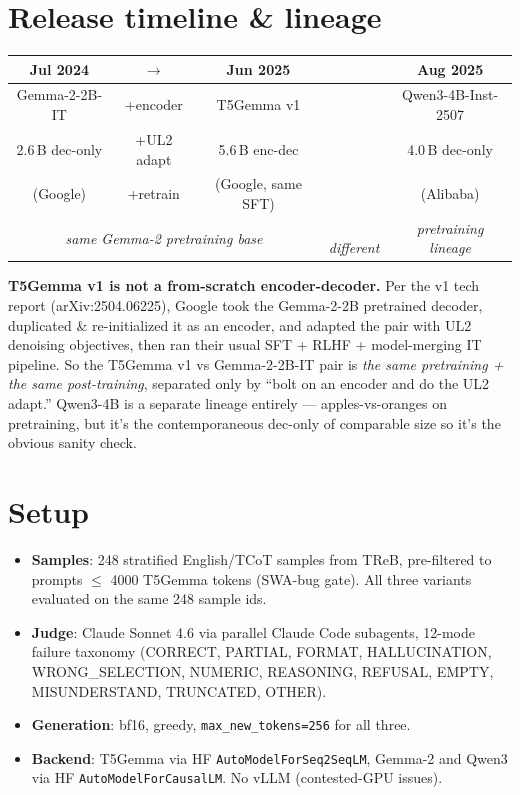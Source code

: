 \documentclass[11pt]{article}
\begin{document}
\section{Release timeline \& lineage}

\begin{center}\small
\begin{tabular}{c c c c c}
\toprule
\textbf{Jul 2024} & $\longrightarrow$ & \textbf{Jun 2025} & & \textbf{Aug 2025} \\
\midrule
\rowcolor{blue!10}
Gemma-2-2B-IT     & \scriptsize +encoder & T5Gemma v1          & & Qwen3-4B-Inst-2507 \\
\rowcolor{blue!10}
2.6\,B dec-only   & \scriptsize +UL2 adapt & 5.6\,B enc-dec     & & 4.0\,B dec-only \\
\rowcolor{blue!10}
(Google)          & \scriptsize +retrain & (Google, same SFT) & & (Alibaba) \\
\bottomrule
\multicolumn{3}{c}{\scriptsize\emph{same Gemma-2 pretraining base}} &
\scriptsize\emph{\,\,different} &
\scriptsize\emph{pretraining lineage} \\
\end{tabular}
\end{center}

\textbf{T5Gemma v1 is not a from-scratch encoder-decoder.} Per the v1 tech
report (arXiv:2504.06225), Google took the Gemma-2-2B pretrained
decoder, duplicated \& re-initialized it as an encoder, and adapted the
pair with UL2 denoising objectives, then ran their usual SFT + RLHF +
model-merging IT pipeline. So the T5Gemma v1 vs Gemma-2-2B-IT pair is
\emph{the same pretraining + the same post-training}, separated only by
``bolt on an encoder and do the UL2 adapt.'' Qwen3-4B is a separate
lineage entirely --- apples-vs-oranges on pretraining, but it's the
contemporaneous dec-only of comparable size so it's the obvious sanity
check.

\section{Setup}

\begin{itemize}
  \item \textbf{Samples}: 248 stratified English/TCoT samples from TReB, pre-filtered
        to prompts $\le$ 4000 T5Gemma tokens (SWA-bug gate). All three variants
        evaluated on the same 248 sample ids.
  \item \textbf{Judge}: Claude Sonnet 4.6 via parallel Claude Code subagents,
        12-mode failure taxonomy (CORRECT, PARTIAL, FORMAT, HALLUCINATION,
        WRONG\_SELECTION, NUMERIC, REASONING, REFUSAL, EMPTY, MISUNDERSTAND,
        TRUNCATED, OTHER).
  \item \textbf{Generation}: bf16, greedy, \verb|max_new_tokens=256| for all three.
  \item \textbf{Backend}: T5Gemma via HF \verb|AutoModelForSeq2SeqLM|, Gemma-2
        and Qwen3 via HF \verb|AutoModelForCausalLM|. No vLLM (contested-GPU issues).
\end{itemize}
\end{document}
